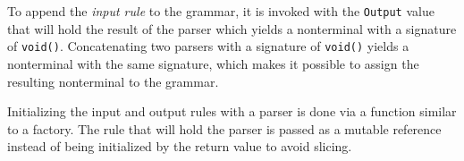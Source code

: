 To append the \emph{input rule} to the grammar, it is invoked with the
\texttt{Output} value that will hold the result of the parser which yields a
nonterminal with a signature of \texttt{void()}. Concatenating two parsers with
a signature of \texttt{void()} yields a nonterminal with the same signature,
which makes it possible to assign the resulting nonterminal to the grammar.

Initializing the input and output rules with a parser is done via a function
similar to a factory. The rule that will hold the parser is passed as a mutable
reference instead of being initialized by the return value to avoid slicing.



